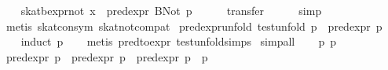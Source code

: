 \begin{isabellebody}
\ \ \isamarkupfalse%
\ {}skat{}bexpr{}not\ x\ {}\ pred{}expr\ {}BNot\ p{}{}\isanewline
\ \ \ \ \isamarkupfalse%
\ transfer\isanewline
\ \ \ \ \isamarkupfalse%
\ simp\isanewline
\ \ \ \ \isamarkupfalse%
\ {}metis\ skat{}con{}sym\ skat{}not{}compat{}\isanewline
{}\isamarkupfalse%
%
\endisatagproof
{\isafoldproof}%
%
\isadelimproof
\isanewline
%
\endisadelimproof
\isanewline
{}\isamarkupfalse%
\ pred{}expr{}unfold{}\ {}test{}unfold\ p\ {}\ pred{}expr\ p{}\isanewline
%
\isadelimproof
\ \ %
\endisadelimproof
%
\isatagproof
{}\isamarkupfalse%
\ {}induct\ p{}\isanewline
\ \ \isamarkupfalse%
\ {}metis\ pred{}to{}expr\ test{}unfold{}simps{}{}{}{}\isanewline
{}\isamarkupfalse%
\ simp{}all\isanewline
\ \ \isamarkupfalse%
\ p{}\ p{}\isanewline
\ \ \isamarkupfalse%
\ {}pred{}expr\ p{}\ {}\ pred{}expr\ p{}\ {}\ pred{}expr\ {}p{}\ {}{}{}\ p{}{}{}\isanewline

\end{isabellebody}
